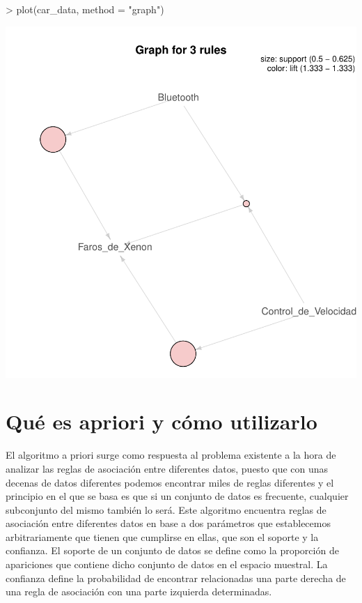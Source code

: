 \documentclass [a4paper] {article}
\begin{document}
\begin{center}
\begin{Schunk}
\begin{Sinput}
> plot(car_data, method = "graph")
\end{Sinput}
\end{Schunk}
\includegraphics{entrega-grafica_apriori_car_graph}
\end{center}

\section{Qué es apriori y cómo utilizarlo}
El algoritmo a priori surge como respuesta al problema existente a la hora de analizar las reglas de asociación 
entre diferentes datos, puesto que con unas decenas de datos diferentes podemos encontrar miles de reglas diferentes y el
principio en el que se basa es que si un conjunto de datos es frecuente, cualquier subconjunto del mismo también lo será. 
Este algoritmo encuentra reglas de asociación entre diferentes datos en base a dos parámetros que establecemos 
arbitrariamente que tienen que cumplirse en ellas, que son el soporte y la confianza. El soporte de un conjunto de datos se 
define como la proporción de apariciones que contiene dicho conjunto de datos en el espacio muestral. La confianza define 
la probabilidad de encontrar relacionadas una parte derecha de una regla de asociación con una parte izquierda determinadas.
\end{document}

